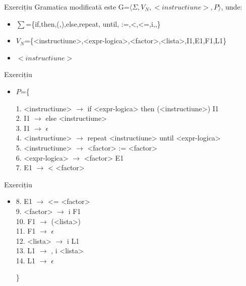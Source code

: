 \documentclass[pdf]{beamer}
\begin{document}
\begin{frame}{Exercițiu}
Gramatica modificată este G=$\langle \Sigma, V_N, <instructiune>, P \rangle$, unde:

\begin{itemize}
\item
$\sum$=\{if,then,(,),else,repeat, until, :=,<,<=,i,,\}
\item
$V_N$=\{<instructiune>,<expr-logica>,<factor>,<lista>,I1,E1,F1,L1\}
\item
$<instructiune>$
\end{itemize}
\end{frame}



\begin{frame}{Exercițiu}
\begin{itemize}
\item
$P$=\{

1. <instructiune> $\rightarrow$ if <expr-logica> then (<instructiune>) I1
\\
2. I1 $\rightarrow$ else <instructiune>
\\
3. I1 $\rightarrow$ $\epsilon$
\\
4. <instructiune> $\rightarrow$ repeat <instructiune> until <expr-logica>
\\
5. <instructiune> $\rightarrow$ <factor> := <factor>
\\
6. <expr-logica> $\rightarrow$ <factor> E1
\\
7. E1 $\rightarrow$ < <factor>

\end{itemize}
\end{frame}



\begin{frame}{Exercițiu}
\begin{itemize}
\item
8. E1 $\rightarrow$ <= <factor>
\\
9. <factor> $\rightarrow$ i F1
\\
10. F1 $\rightarrow$ (<lista>)
\\
11. F1 $\rightarrow$ $\epsilon$
\\
12. <lista> $\rightarrow$ i L1
\\
13. L1 $\rightarrow$ , i <lista>
\\
14. L1 $\rightarrow$ $\epsilon$

\}
\end{itemize}
\end{frame}
\end{document}
